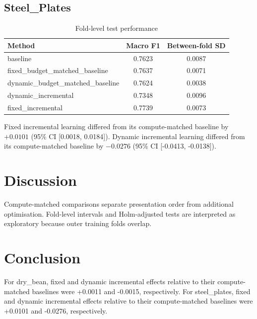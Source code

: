 \subsection{Steel\_Plates}
\begin{table}[t]
\caption{Fold-level test performance}
\centering
\begin{tabular}{lcc}
\toprule
Method & Macro F1 & Between-fold SD\\
\midrule
baseline & 0.7623 & 0.0087\\
fixed\_budget\_matched\_baseline & 0.7637 & 0.0071\\
dynamic\_budget\_matched\_baseline & 0.7624 & 0.0038\\
dynamic\_incremental & 0.7348 & 0.0096\\
fixed\_incremental & 0.7739 & 0.0073\\
\bottomrule
\end{tabular}
\end{table}
\begin{table}[t]
\caption{Computational efficiency}
\centering
{}
\end{table}
Fixed incremental learning differed from its compute-matched baseline by $+0.0101$ (95\% CI [0.0018, 0.0184]). Dynamic incremental learning differed from its compute-matched baseline by $-0.0276$ (95\% CI [-0.0413, -0.0138]).
\section{Discussion}
Compute-matched comparisons separate presentation order from additional optimisation. Fold-level intervals and Holm-adjusted tests are interpreted as exploratory because outer training folds overlap.
\section{Conclusion}
For dry\_bean, fixed and dynamic incremental effects relative to their compute-matched baselines were +0.0011 and -0.0015, respectively. 
For steel\_plates, fixed and dynamic incremental effects relative to their compute-matched baselines were +0.0101 and -0.0276, respectively. 